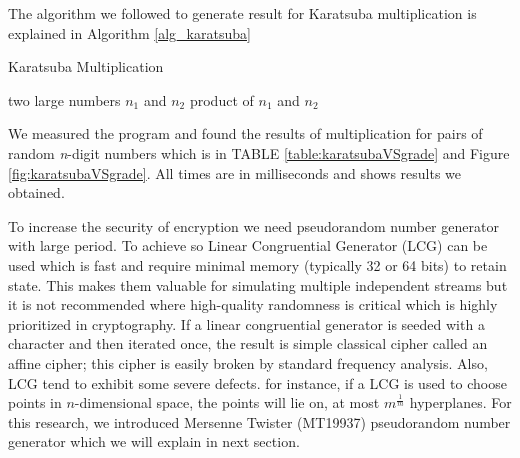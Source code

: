 \documentclass[12pt,journal,compsoc]{IEEEtran}
\begin{document}
The algorithm we followed to generate result for Karatsuba multiplication is explained in Algorithm \ref{alg_karatsuba}
\begin{algorithm}                      %
\caption{Karatsuba Multiplication}          %
\label{alg_karatsuba}                           %
\begin{algorithmic}                    %
    \REQUIRE two large numbers $n_1$ and $n_2$
    \ENSURE product of $n_1$ and $n_2$

    \ENDIF
    
    \ELSE
    \ENDIF
    
    
    
\end{algorithmic}
\end{algorithm}
%	

We measured the program and found the results of multiplication for pairs of random \emph{n}-digit numbers which is in TABLE \ref{table:karatsubaVSgrade} and Figure \ref{fig:karatsubaVSgrade}. All times are in milliseconds and  shows results we obtained.

To increase the security of encryption we need pseudorandom number generator with large period. To achieve so Linear Congruential Generator (LCG)\cite{lcg_cryptography} can be used which is fast and require minimal memory (typically 32 or 64 bits) to retain state. This makes them valuable for simulating multiple independent streams but it is not recommended where high-quality randomness is critical which is highly prioritized in cryptography. If a linear congruential generator is seeded with a character and then iterated once, the result is simple classical cipher called an affine cipher\cite{affine_cipher}; this cipher is easily broken by standard frequency analysis. Also, LCG tend to exhibit some severe defects. for instance, if a LCG is used to choose points in $n$-dimensional space, the points will lie on, at most $m^{\frac{1}{m}}$ hyperplanes\cite{marsaglia_theorem}. For this research, we introduced Mersenne Twister (MT19937) pseudorandom number generator which we will explain in next section.
\end{document}
